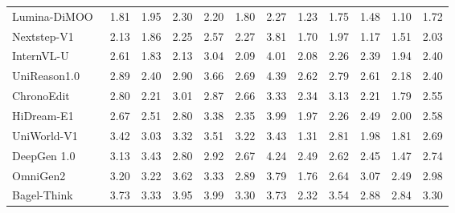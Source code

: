 \documentclass{llmxive}
\begin{document}
\begin{table}[t]
{\begin{tabular}{l|cccccccccc|c}
            
            Lumina-DiMOO~\cite{xin2025lumina}
            & 1.81 & 1.95 & 2.30 & 2.20 & 1.80 & 2.27 & 1.23 & 1.75 &  1.48 & 1.10
            & \cellcolor[HTML]{C8C8C8}1.72 \\

            Nextstep-V1~\cite{han2025nextstep}
            & 2.13 & 1.86 & 2.25 & 2.57 & 2.27 & 3.81 & 1.70 & 1.97 & 1.17 & 1.51
            & \cellcolor[HTML]{C8C8C8}2.03 \\


            InternVL-U~\cite{tian2026internvl}
            & 2.61 & 1.83 & 2.13 & 3.04 & 2.09 & 4.01 & 2.08 & 2.26 & 2.39 & 1.94
            & \cellcolor[HTML]{C8C8C8}2.40 \\

            UniReason1.0~\cite{wang2026unireason}
            & 2.89 & 2.40 & 2.90 & 3.66 & 2.69 & 4.39 & 2.62 & 2.79 & 2.61 & 2.18
            & \cellcolor[HTML]{C8C8C8}2.40 \\

            ChronoEdit~\cite{wu2025chronoedit}
            & 2.80 & 2.21 & 3.01 & 2.87 & 2.66 & 3.33 & 2.34 & 3.13 & 2.21 & 1.79
            & \cellcolor[HTML]{C8C8C8}2.55 \\
            
            HiDream-E1~\cite{cai2025hidream}
            & 2.67 & 2.51 & 2.80 & 3.38 & 2.35 & 3.99 & 1.97 & 2.26 & 2.49 & 2.00
            & \cellcolor[HTML]{C8C8C8}2.58 \\

            
            UniWorld-V1~\cite{lin2025uniworld}
            & 3.42 & 3.03 & 3.32 & 3.51 & 3.22 & 3.43 & 1.31 & 2.81 & 1.98 & 1.81
            & \cellcolor[HTML]{C8C8C8}2.69 \\
            
            

            DeepGen 1.0~\cite{wang2026deepgen}
            & 3.13 & 3.43 & 2.80 & 2.92 & 2.67 & 4.24 & 2.49 & 2.62 & 2.45 & 1.47
            & \cellcolor[HTML]{C8C8C8}2.74 \\


            OmniGen2~\cite{wu2025omnigen2}
            & 3.20 & 3.22 & 3.62 & 3.33 & 2.89 & 3.79 & 1.76 & 2.64 & 3.07 & 2.49
            & \cellcolor[HTML]{C8C8C8}2.98 \\

            Bagel-Think~\cite{deng2025emerging}
            & 3.73 & 3.33 & 3.95 & 3.99 & 3.30 & 3.73 & 2.32 & 3.54 & 2.88 & 2.84
            & \cellcolor[HTML]{C8C8C8}3.30 \\


\end{tabular}}
\end{table}
\end{document}

